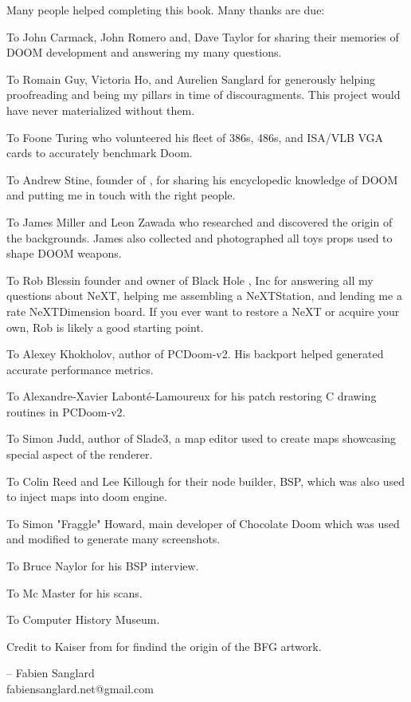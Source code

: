 Many people helped completing this book. Many thanks are due:\\
\par
To John Carmack, John Romero and, Dave Taylor for sharing their memories of DOOM development and answering my many questions.\\
\par
To Romain Guy, Victoria Ho, and Aurelien Sanglard for generously helping proofreading and being my pillars in time of discouragments. This project would have never materialized without them.\\ 
\par
To Foone Turing who volunteered his fleet of 386s, 486s, and ISA/VLB VGA cards to accurately benchmark Doom.\\
\par
To Andrew Stine, founder of , for sharing his encyclopedic knowledge of DOOM and putting me in touch with the right people.\\
\par
To James Miller and Leon Zawada who researched and discovered the origin of the backgrounds. James also collected and photographed all toys props used to shape DOOM weapons.\\
\par
To Rob Blessin founder and owner of Black Hole , Inc for answering all my questions about NeXT, helping me assembling a NeXTStation, and lending me a rate NeXTDimension board. If you ever want to restore a NeXT or acquire your own, Rob is likely a good starting point.\\
\par
To Alexey Khokholov, author of PCDoom-v2. His backport helped generated accurate performance metrics.\\
\par
To Alexandre-Xavier Labont\'e-Lamoureux for his patch restoring C drawing routines in PCDoom-v2.\\
\par
To Simon Judd, author of Slade3, a map editor used to create maps showcasing special aspect of the renderer.\\
\par
To Colin Reed and Lee Killough for their node builder, BSP, which was also used to inject maps into doom engine.\\
\par
To Simon "Fraggle" Howard, main developer of Chocolate Doom which was used and modified to generate many screenshots.\\
\par
To Bruce Naylor for his BSP interview.\\
\par
To Mc Master for his scans.\\
\par
To Computer History Museum.\\
\par
Credit to Kaiser from  for findind the origin of the BFG artwork.\\
\par

-- Fabien Sanglard\\
fabiensanglard.net@gmail.com
